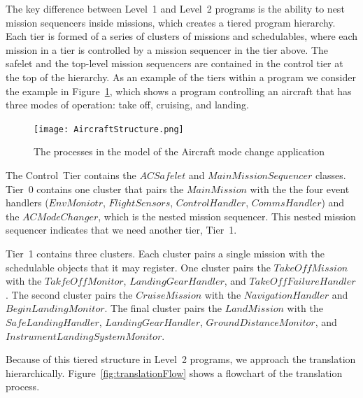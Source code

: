 \documentclass[10pt,a4paper]{article}
\begin{document}


The key difference between Level~1 and Level~2 programs is the ability to nest mission sequencers inside missions, which creates a tiered program hierarchy. Each tier is formed of a series of clusters of missions and schedulables, where each mission in a tier is controlled by a mission sequencer in the tier above. The safelet and the top-level mission sequencers are contained in the control tier at the top of the hierarchy. As an example of the tiers within a program we consider the example in Figure~\ref{fig:AircraftDiagram}, which shows a program controlling an aircraft that has three modes of operation: take off, cruising, and landing.

\begin{figure}[!h]
\begin{center}
\texttt{[image: AircraftStructure.png]}
\caption{The processes in the model of the Aircraft mode change application \label{fig:AircraftDiagram}}
\end{center}
\end{figure}

The Control~Tier contains the $ACSafelet$ and $MainMissionSequencer$ classes. Tier~0 contains one cluster that pairs the $MainMission$ with the the four event handlers ($EnvMoniotr$, $FlightSensors$, $ControlHandler$, $CommsHandler$) and the $ACModeChanger$, which is the nested mission sequencer. This nested mission sequencer indicates that we need another tier, Tier~1.

Tier~1 contains three clusters. Each cluster pairs a single mission with the schedulable objects that it may register. One cluster pairs the $TakeOffMission$ with the $TakfeOffMonitor$, $LandingGearHandler$, and $TakeOffFailureHandler$. The second cluster pairs the $CruiseMission$ with the $NavigationHandler$ and $BeginLandingMonitor$. The final cluster pairs the $LandMission$ with the $SafeLandingHandler$, $LandingGearHandler$, $GroundDistanceMonitor$, and $InstrumentLandingSystemMonitor$. 

Because of this tiered structure in Level~2 programs, we approach the translation hierarchically. Figure~\ref{fig:translationFlow} shows a flowchart of the translation process. 
\end{document}
